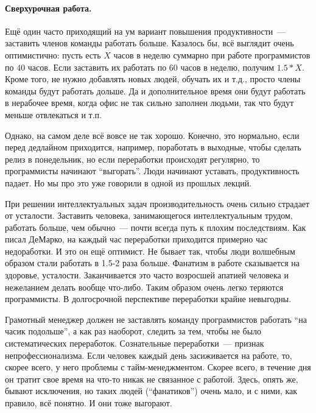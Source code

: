 \documentclass{../../text-style}
\begin{document}
\paragraph{Сверхурочная работа.} Ещё один часто приходящий на ум вариант повышения продуктивности~--- заставить членов команды работать больше. Казалось бы, всё выглядит очень оптимистично: пусть есть $X$ часов в неделю суммарно при работе программистов по $40$ часов. Если заставить их работать по $60$ часов в неделю, получим $1.5 * X$. Кроме того, не нужно добавлять новых людей, обучать их и т.д., просто члены команды будут работать дольше. Да и дополнительное время они будут работать в нерабочее время, когда офис не так сильно заполнен людьми, так что будут меньше отвлекаться и т.п.

Однако, на самом деле всё вовсе не так хорошо. Конечно, это нормально, если перед дедлайном приходится, например, поработать в выходные, чтобы сделать релиз в понедельник, но если переработки происходят регулярно, то программисты начинают \enquote{выгорать}. Люди начинают уставать, продуктивность падает. Но мы про это уже говорили в одной из прошлых лекций.

При решении интеллектуальных задач производительность очень сильно страдает от усталости. Заставить человека, занимающегося интеллектуальным трудом, работать больше, чем обычно~--- почти всегда путь к плохим последствиям. Как писал ДеМарко, на каждый час переработки приходится примерно час недоработки. И это он ещё оптимист. Не бывает так, чтобы люди волшебным образом стали работать в 1.5-2 раза больше. Фанатизм в работе сказывается на здоровье, усталости. Заканчивается это часто возросшей апатией человека и нежеланием делать вообще что-либо. Таким образом очень легко теряются программисты. В долгосрочной перспективе переработки крайне невыгодны.

Грамотный менеджер должен не заставлять команду программистов работать \enquote{на часик подольше}, а как раз наоборот, следить за тем, чтобы не было систематических переработок. Сознательные переработки~--- признак непрофессионализма. Если человек каждый день засиживается на работе, то, скорее всего, у него проблемы с тайм-менеджментом. Скорее всего, в течение дня он тратит свое время на что-то никак не связанное с работой. Здесь, опять же, бывают исключения, но таких людей (\enquote{фанатиков}) очень мало, и с ними, как правило, всё понятно. И они тоже выгорают.
\end{document}
